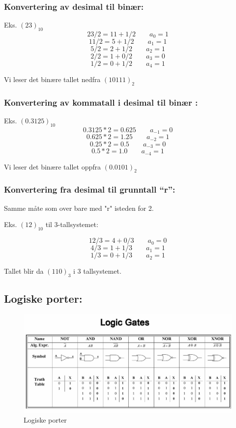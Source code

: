 \documentclass{article}
\begin{document}
	
	
	\subsubsection{Konvertering av desimal til binær:}
	
	Eks. $(23)_{10}$
	$$ 23/2 = 11 + 1/2 \qquad a_0 = 1 $$
	$$ 11/2 = 5 + 1/2 \qquad a_1 = 1 $$
	$$ 5/2 = 2 + 1/2 \qquad a_2 = 1 $$	
	$$ 2/2 = 1 + 0/2 \qquad a_3 = 0 
	$$
	$$1/2 = 0 + 1/2 \qquad a_4 = 1
	$$
	
	Vi leser det binære tallet nedfra $(10111)_{2}$
	
	\subsubsection{Konvertering av kommatall i desimal til binær :}
	Eks. $(0.3125)_{10}$
	$$ 0.3125*2 = 0.625 \qquad a_{-1} = 0 $$
	$$ 0.625*2 = 1.25 \qquad a_{-2} = 1 $$
	$$ 0.25*2 = 0.5 \qquad a_{-3} = 0 $$	
	$$ 0.5*2 = 1.0 \qquad a_{-4} = 1 $$
		
	Vi leser det binære tallet oppfra $(0.0101)_{2}$
	
	\subsubsection{Konvertering fra desimal til grunntall “r”:}
	Samme måte som over bare med "r" isteden for 2.
	
	Eks. $(12)_{10}$ til 3-tallsystemet:
	
	$$ 12/3 = 4 + 0/3 \qquad a_0 = 0$$
	$$ 4/3 = 1 + 1/3 \qquad a_1 = 1$$
	$$ 1/3 = 0 + 1/3 \qquad a_2 = 1 $$
	
	Tallet blir da $(110)_3$ i 3 tallsystemet.
	
	\subsection{Logiske porter:}
		
	\begin{figure}[H]
		\includegraphics[scale=0.35]{GATES.jpg}
		\caption{Logiske porter}
	\end{figure}
	
\end{document}

